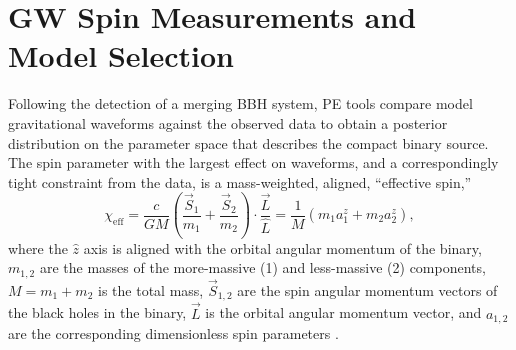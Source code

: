 \documentclass[modern,linenumbers]{aastex61}
\newcommand{\chieff}{\chi_\mathrm{eff}}
\newcommand{\checkme}[1]{\textcolor{red}{#1}}
\newcommand{\OOneSigmaIsoAligned}{\checkme{1.7}}
\newcommand{\OOneOddsIsoAligned}{\checkme{0.087}}
\newcommand{\OTwoSigmaIsoAlignedMin}{\checkme{3.0}}
\newcommand{\OTwoOddsIsoAlignedMin}{\checkme{0.0012}}
\begin{document}
\begin{abstract}
  The first direct detections of \acp{GW} from merging \acp{BBH} open
  a unique window into the formation environment of massive stars and
  their compact remnants.  One promising signature of the formation
  environment is the angular distribution of the \ac{BH} spins;
  systems formed through dynamical interacions among already-compact
  objects are expected to have isotropic spin orientations while
  binaries formed from pairs of stars born together are more likely to
  have spins aligned with the binary orbit as a consequence of their
  joint evolution toward a \ac{BBH} system.  By considering existing
  \ac{GW} measurements of $\chieff$, the best-measured combination of
  spin parameters, in the three likely binary black hole detections
  GW150914, LVT151012, and GW151226, we show that the data already
  exhibit a $\OOneSigmaIsoAligned\sigma$ ($\OOneOddsIsoAligned$ odds
  ratio) preference for an isotropic angular distribution amongst a
  suite of models for the spin distribution.  By considering the
  effect of an additional 10 detections drawn from the various models
  in the suite we show that such an agumented data set would enable at
  least a $\OTwoSigmaIsoAlignedMin\sigma$ ($\OTwoOddsIsoAlignedMin$
  odds ratio) distinction between the isotropic and aligned models,
  and in most cases better than $5\sigma$ ($2.9 \times 10^{-7}$ odds
  ratio).  The existing data strongly suggest a dynamical formation
  secnario for the observed systems, and this will be confirmed (or
  overturned) confidently in the near future by subsequent
  observations.
\end{abstract}

\acresetall{}

\section{\ac{GW} Spin Measurements and Model Selection}
\label{sec:O1}

Following the detection of a merging \ac{BBH} system, \ac{PE} tools
\citep{2015PhRvD..91d2003V} compare model gravitational waveforms
\citep{2014PhRvD..89h4006P,2014PhRvD..89f1502T,2014PhRvL.113o1101H}
against the observed data to obtain a posterior distribution on the
parameter space that describes the compact binary source.  The spin
parameter with the largest effect on waveforms, and a correspondingly
tight constraint from the data, is a mass-weighted, aligned,
``effective spin,''
\begin{equation}
  \chieff = \frac{c}{GM} \left( \frac{\vec{S}_1}{m_1} + \frac{\vec{S}_2}{m_2}
  \right) \cdot \frac{\vec{L}}{\hat{L}} = \frac{1}{M} \left( m_1 a_1^z + m_2 a_2^z \right),
\end{equation}
where the $\hat{z}$ axis is aligned with the orbital angular momentum
of the binary, $m_{1,2}$ are the masses of the more-massive (1) and
less-massive (2) components, $M = m_1 + m_2$ is the total mass,
$\vec{S}_{1,2}$ are the spin angular momentum vectors of the black
holes in the binary, $\vec{L}$ is the orbital angular momentum vector,
and $a_{1,2}$ are the corresponding dimensionless spin parameters
\citep{2016PhRvL.116x1102A}.
\end{document}

